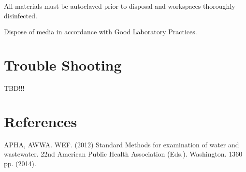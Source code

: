 \documentclass[12pt]{../SOP4_alpha}\usepackage[]{graphicx}\usepackage[]{xcolor}
\begin{document}
\NP All materials must be autoclaved prior to disposal and workspaces
thoroughly disinfected.

\NP Dispose of media in accordance with Good Laboratory Practices.

\section{Trouble Shooting}

TBD!!! 


\section{References}

\NP APHA, AWWA. WEF. (2012) Standard Methods for examination of water and wastewater. 22nd American Public Health Association (Eds.). Washington. 1360 pp. (2014).
\end{document}
